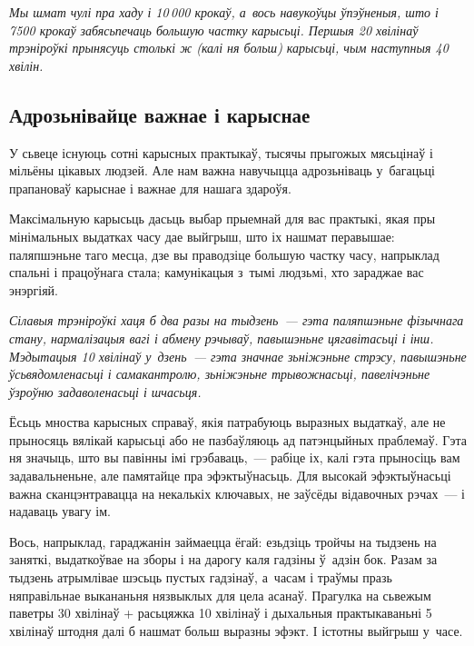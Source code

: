 \emph{Мы шмат чулі пра хаду і 10\,000 крокаў, а~вось навукоўцы ўпэўненыя, што і 7500 крокаў забясьпечаць большую частку карысьці. Першыя 20 хвілінаў трэніроўкі прынясуць столькі ж (калі ня больш) карысьці, чым наступныя 40 хвілін.}

\subsection*{Адрозьнівайце важнае і карыснае}

У сьвеце існуюць сотні карысных практыкаў, тысячы прыгожых мясьцінаў і мільёны цікавых людзей. Але нам важна навучыцца адрозьніваць у~багацьці прапановаў карыснае і важнае для нашага здароўя. 


Максімальную карысьць дасьць выбар прыемнай для вас практыкі, якая пры мінімальных выдатках часу дае выйгрыш, што іх нашмат перавышае: паляпшэньне таго месца, дзе вы праводзіце большую частку часу, напрыклад спальні і працоўнага стала; камунікацыя з~тымі людзьмі, хто зараджае вас энэргіяй.

\emph{Сілавыя трэніроўкі хаця б два разы на тыдзень~--- гэта паляпшэньне фізычнага стану, нармалізацыя вагі і абмену рэчываў, павышэньне цягавітасьці і інш. Мэдытацыя 10 хвілінаў у~дзень~--- гэта значнае зьніжэньне стрэсу, павышэньне ўсьвядомленасьці і самакантролю, зьніжэньне трывожнасьці, павелічэньне ўзроўню задаволенасьці і шчасьця.}

Ёсьць мноства карысных справаў, якія патрабуюць выразных выдаткаў, але не прыносяць вялікай карысьці або не пазбаўляюць ад патэнцыйных праблемаў. Гэта ня значыць, што вы павінны імі грэбаваць,~--- рабіце іх, калі гэта прыносіць вам задавальненьне, але памятайце пра эфэктыўнасьць. Для высокай эфэктыўнасьці важна сканцэнтравацца на некалькіх ключавых, не заўсёды відавочных рэчах~--- і надаваць увагу ім.

Вось, напрыклад, гараджанін займаецца ёгай: езьдзіць тройчы на тыдзень на заняткі, выдаткоўвае на зборы і на дарогу каля гадзіны ў~адзін бок. Разам за тыдзень атрымлівае шэсьць пустых гадзінаў, а~часам і траўмы празь няправільнае выкананьня нязвыклых для цела асанаў. Прагулка на сьвежым паветры 30 хвілінаў + расьцяжка 10 хвілінаў і дыхальныя практыкаваньні 5 хвілінаў штодня далі б нашмат больш выразны эфэкт. І істотны выйгрыш у~часе.

